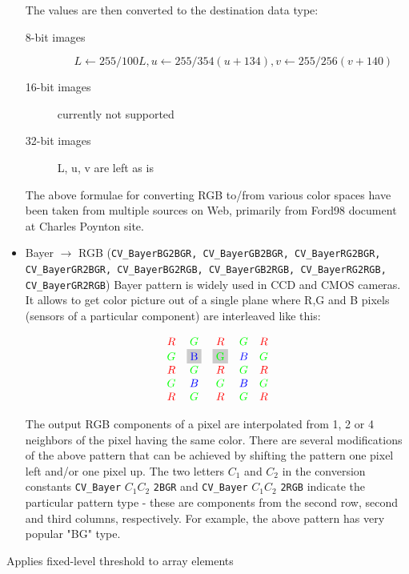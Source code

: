 \begin{itemize}
The values are then converted to the destination data type:
\begin{description}
\item[8-bit images]
\[L \leftarrow 255/100 L, u \leftarrow 255/354 (u + 134), v \leftarrow 255/256 (v + 140) \]
\item[16-bit images] currently not supported
\item[32-bit images] L, u, v are left as is
\end{description}

The above formulae for converting RGB to/from various color spaces have been taken from multiple sources on Web, primarily from
Ford98
document at Charles Poynton site.

 \item Bayer $\rightarrow$ RGB (\texttt{CV\_BayerBG2BGR, CV\_BayerGB2BGR, CV\_BayerRG2BGR, CV\_BayerGR2BGR, CV\_BayerBG2RGB, CV\_BayerGB2RGB, CV\_BayerRG2RGB, CV\_BayerGR2RGB}) Bayer pattern is widely used in CCD and CMOS cameras. It allows to get color picture out of a single plane where R,G and B pixels (sensors of a particular component) are interleaved like this:

\newcommand{\R}{\color{red}R}
\newcommand{\G}{\color{green}G}
\newcommand{\B}{\color{blue}B}


\[
\definecolor{BackGray}{rgb}{0.8,0.8,0.8}
\begin{array}{ c c c c c }
\R&\G&\R&\G&\R\\
\G&\colorbox{BackGray}{\B}&\colorbox{BackGray}{\G}&\B&\G\\
\R&\G&\R&\G&\R\\
\G&\B&\G&\B&\G\\
\R&\G&\R&\G&\R
\end{array}
\]

The output RGB components of a pixel are interpolated from 1, 2 or
4 neighbors of the pixel having the same color. There are several
modifications of the above pattern that can be achieved by shifting
the pattern one pixel left and/or one pixel up. The two letters
$C_1$ and $C_2$
in the conversion constants
\texttt{CV\_Bayer} $ C_1 C_2 $ \texttt{2BGR}
and
\texttt{CV\_Bayer} $ C_1 C_2 $ \texttt{2RGB}
indicate the particular pattern
type - these are components from the second row, second and third
columns, respectively. For example, the above pattern has very
popular "BG" type.
\end{itemize}

\label{Threshold}

Applies fixed-level threshold to array elements

